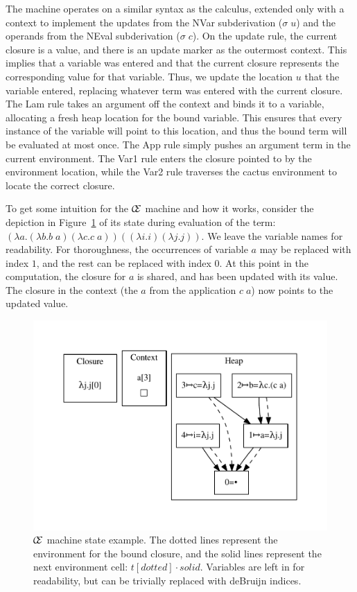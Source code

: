 The machine operates on a similar syntax as the calculus, extended only with a
context to implement the updates from the NVar subderivation ($\sigma \; u$) and
the operands from the NEval subderivation ($\sigma \; c$). On the update rule,
the current closure is a value, and there is an update marker as the outermost
context. This implies that a variable was entered and that the current closure
represents the corresponding value for that variable. Thus, we update the
location $u$ that the variable entered, replacing whatever term was entered
with the current closure. The Lam rule takes an argument off the context and
binds it to a variable, allocating a fresh heap location for the bound
variable. This ensures that every instance of the variable will point to this
location, and thus the bound term will be evaluated at most once. The App rule
simply pushes an argument term in the current environment. The Var1 rule enters
the closure pointed to by the environment location, while the Var2 rule
traverses the cactus environment to locate the correct closure.  

To get some intuition for the $\mathcal{\mathcal{C} \mskip -4mu \mathcal{E}}$
machine and how it works, consider the depiction in Figure~\ref{fig:state} of
its state during evaluation of the term: $(\lambda a.(\lambda b.b \; a)
(\lambda c.c \; a)) ((\lambda i.i) (\lambda j.j))$. We leave the variable names
for readability. For thoroughness, the occurrences of variable $a$ may be
replaced with index $1$, and the rest can be replaced with index $0$. At this
point in the computation, the closure for $a$ is shared, and has been updated
with its value. The closure in the context (the $a$ from the application $c
\; a$) now points to the updated value.

\begin{figure}
\includegraphics[width=\linewidth]{figures/18.pdf}

\caption{$\mathcal{\mathcal{C} \mskip -4mu \mathcal{E}}$ machine state example.
The dotted lines represent the environment for the bound closure, and the solid
lines represent the next environment cell:  $t[dotted] \cdot solid$.  Variables
are left in for readability, but can be trivially replaced with deBruijn
indices.  }
\label{fig:state}
\end{figure}

